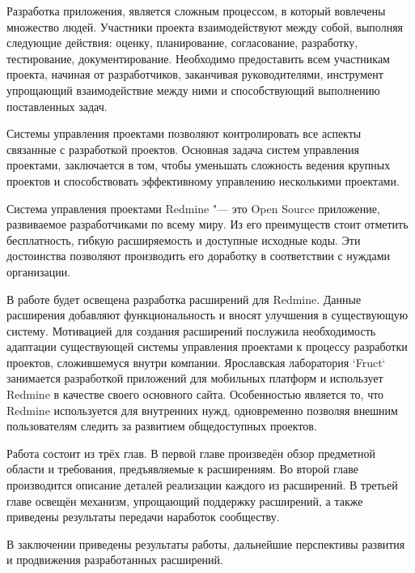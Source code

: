 Разработка приложения, является сложным процессом, в который
вовлечены множество людей. Участники проекта взаимодействуют между собой,
выполняя следующие действия: оценку, планирование, согласование, разработку,
тестирование, документирование. Необходимо предоставить всем участникам
проекта, начиная от разработчиков, заканчивая руководителями, инструмент
упрощающий взаимодействие между ними и способствующий выполнению поставленных
задач.

Системы управления проектами позволяют контролировать все аспекты связанные с
разработкой проектов. Основная задача систем управления проектами, заключается в
том, чтобы уменьшать сложность ведения крупных проектов и способствовать
эффективному управлению несколькими проектами.

Система управления проектами Redmine "--- это Open Source приложение,
развиваемое разработчиками по всему миру. Из его преимуществ стоит
отметить бесплатность, гибкую расширяемость и доступные исходные коды. Эти
достоинства позволяют производить его доработку в соответствии с нуждами
организации.

В работе будет освещена разработка расширений для Redmine. Данные
расширения добавляют функциональность и вносят улучшения в существующую
систему. Мотивацией для создания расширений послужила необходимость адаптации
существующей системы управления проектами к процессу разработки проектов,
сложившемуся внутри компании. Ярославская лаборатория `Fruct` занимается
разработкой приложений для мобильных платформ и использует Redmine в качестве
своего основного сайта. Особенностью является то, что Redmine используется для
внутренних нужд, одновременно позволяя внешним пользователям следить за
развитием общедоступных проектов.

Работа состоит из трёх глав. В первой главе произведён обзор предметной области
и требования, предъявляемые к расширениям. Во второй главе производится
описание деталей реализации каждого из расширений. В третьей главе освещён
механизм, упрощающий поддержку расширений, а также приведены результаты
передачи наработок сообществу.

В заключении приведены результаты работы, дальнейшие перспективы развития и
продвижения разработанных расширений.

